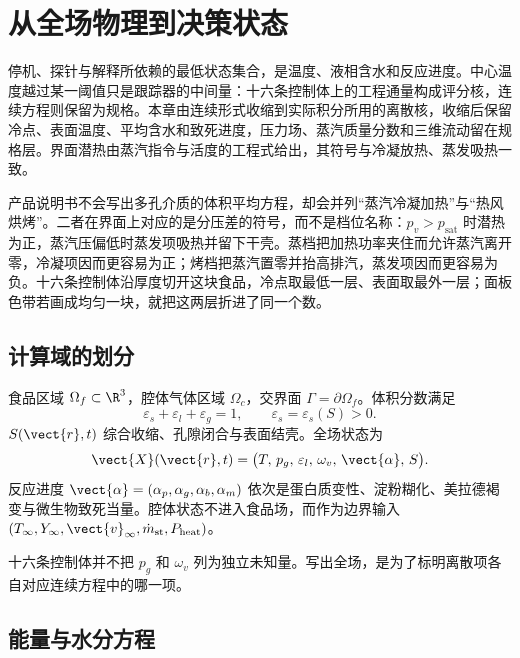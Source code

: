 \chapter{从全场物理到决策状态}
\label{ch:physics}

停机、探针与解释所依赖的最低状态集合，是温度、液相含水和反应进度。中心温度越过某一阈值只是跟踪器的中间量：十六条控制体上的工程通量构成评分核，连续方程则保留为规格。本章由连续形式收缩到实际积分所用的离散核，收缩后保留冷点、表面温度、平均含水和致死进度，压力场、蒸汽质量分数和三维流动留在规格层。界面潜热由蒸汽指令与活度的工程式给出，其符号与冷凝放热、蒸发吸热一致。

产品说明书不会写出多孔介质的体积平均方程，却会并列“蒸汽冷凝加热”与“热风烘烤”。二者在界面上对应的是分压差的符号，而不是档位名称：\(p_v>p_{\mathrm{sat}}\) 时潜热为正，蒸汽压偏低时蒸发项吸热并留下干壳。蒸档把加热功率夹住而允许蒸汽离开零，冷凝项因而更容易为正；烤档把蒸汽置零并抬高排汽，蒸发项因而更容易为负。十六条控制体沿厚度切开这块食品，冷点取最低一层、表面取最外一层；面板色带若画成均匀一块，就把这两层折进了同一个数。

\section{计算域的划分}

食品区域 \(\Omega_f\subset\R^3\)，腔体气体区域 \(\Omega_c\)，交界面 \(\Gamma=\partial\Omega_f\)。体积分数满足
\[
\varepsilon_s+\varepsilon_l+\varepsilon_g=1,\qquad \varepsilon_s=\varepsilon_s(S)>0.
\]
\(S(\vect{r},t)\) 综合收缩、孔隙闭合与表面结壳。全场状态为
\begin{equation}
\label{eq:state}
\vect{X}(\vect{r},t)=\big(T,\,p_g,\,\varepsilon_l,\,\omega_v,\,\vect{\alpha},\,S\big).
\end{equation}
反应进度 \(\vect{\alpha}=(\alpha_p,\alpha_g,\alpha_b,\alpha_m)\) 依次是蛋白质变性、淀粉糊化、美拉德褐变与微生物致死当量。腔体状态不进入食品场，而作为边界输入 \((T_\infty,Y_\infty,\vect{v}_\infty,\dot m_{\mathrm{st}},P_{\mathrm{heat}})\)。

十六条控制体并不把 \(p_g\) 和 \(\omega_v\) 列为独立未知量。写出全场，是为了标明离散项各自对应连续方程中的哪一项。

\section{能量与水分方程}

